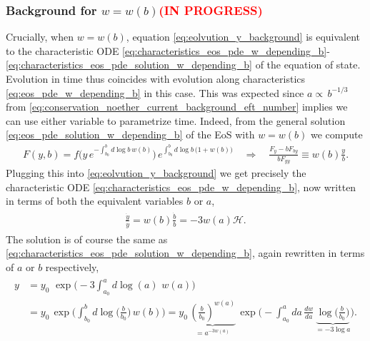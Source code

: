 \subsubsection{Background for $w=w(b)$\textcolor{red}{(IN PROGRESS)}}\label{sec:bkg_evolution_eft_wb}
%
Crucially, when $w=w(b)$, equation \eqref{eq:eolvution_y_background} is equivalent to the characteristic ODE \eqref{eq:characteristics_eos_pde_w_depending_b}-\eqref{eq:characteristics_eos_pde_solution_w_depending_b} of the equation of state.
Evolution in time thus coincides with evolution along characteristics \eqref{eq:eos_pde_w_depending_b} in this case.
This was expected since $a\propto\, b^{-1/3}$ from \eqref{eq:conservation_noether_current_background_eft_number} implies we can use either variable to parametrize time.
Indeed, from the general solution \eqref{eq:eos_pde_solution_w_depending_b} of the EoS with  $w=w(b)$ we compute
\begin{align}
    F(y,b)=f\Big(y\, e^{-\int_{b_0}^bd\log b\, w(b)}\Big)\, e^{\int_{b_0}^bd\log b\, \big(1+w(b)\big)} \quad \Rightarrow\quad  \frac{F_y-bF_{by}}{bF_{yy}} \equiv w(b)\frac{y}{b}.
\end{align}
Plugging this into \eqref{eq:eolvution_y_background} we get precisely the characteristic ODE \eqref{eq:characteristics_eos_pde_w_depending_b}, now written in terms of both the equivalent variables $b$ or $a$,
{\small\begin{align}\label{eq:evolution_y_background_equation_final}
\begin{aligned}
    \frac{\dot{y}}{y}=w(b)\frac{\dot{b}}{b}=-3w(a)\mathcal{H}.
\end{aligned}
\end{align}}
The solution is of course the same as \eqref{eq:characteristics_eos_pde_solution_w_depending_b}, again rewritten in terms of $a$ or $b$ respectively,
{\small\begin{align}\label{eq:evolution_y_background_solution}
\begin{aligned}
    y
    &=y_0\,\,\exp\Big(\!\!-\!\!3\!\!\int^a_{a_0}\!\!\!\!\!d\!\log(a)\,\, w(a)\Big)\\[2.5pt]
    &=y_0\,\exp\Big(\!\int_{b_0}^b\!\!\!\!\!d\!\log\big(\tfrac{b}{b_0}\big)\,w(b)\Big)
    =y_0\,\underbrace{\left(\tfrac{b}{b_0}\right)^{w(a)}}_{=a^{-3w(a)}}\,\exp\Big(\!\!-\!\!\!\int_{a_0}^a\!\!\!\!\!da\, \tfrac{dw}{da}\, \underbrace{\log\big(\tfrac{b}{b_0}\big)}_{=-3\log a}\Big).
\end{aligned}
\end{align}}
